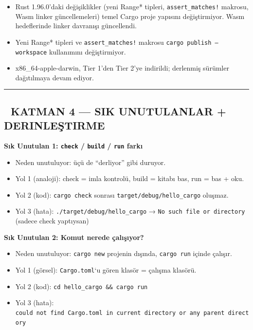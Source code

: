 \documentclass[12pt,a4paper]{article}
\begin{document}
\begin{itemize}
\tightlist
\item
  Rust 1.96.0'daki değişiklikler (yeni Range* tipleri, \texttt{assert\_matches!} makrosu, Wasm linker güncellemeleri) temel Cargo proje yapısını değiştirmiyor. Wasm hedeflerinde linker davranışı güncellendi.
\item
  Yeni Range* tipleri ve \texttt{assert\_matches!} makrosu \texttt{cargo\ publish\ --workspace} kullanımını değiştirmiyor.
\item
  x86\_64-apple-darwin, Tier 1'den Tier 2'ye indirildi; derlenmiş sürümler dağıtılmaya devam ediyor.
\end{itemize}

\begin{center}\rule{0.5\linewidth}{0.5pt}\end{center}

\subsection{🔴 KATMAN 4 --- SIK UNUTULANLAR + DERINLEŞTIRME}\label{katman-4-—-sik-unutulanlar-derinleştirme}

\textbf{Sık Unutulan 1: \texttt{check} / \texttt{build} / \texttt{run} farkı}

\begin{itemize}
\tightlist
\item
  Neden unutuluyor: üçü de ``derliyor'' gibi duruyor.
\item
  Yol 1 (analoji): check = imla kontrolü, build = kitabı bas, run = bas + oku.
\item
  Yol 2 (kod): \texttt{cargo\ check} sonrası \texttt{target/debug/hello\_cargo} oluşmaz.
\item
  Yol 3 (hata): \texttt{./target/debug/hello\_cargo} → \texttt{No\ such\ file\ or\ directory} (sadece check yaptıysan)
\end{itemize}

\textbf{Sık Unutulan 2: Komut nerede çalışıyor?}

\begin{itemize}
\tightlist
\item
  Neden unutuluyor: \texttt{cargo\ new} projenin dışında, \texttt{cargo\ run} içinde çalışır.
\item
  Yol 1 (görsel): \texttt{Cargo.toml}`u gören klasör = çalışma klasörü.
\item
  Yol 2 (kod): \texttt{cd\ hello\_cargo\ \&\&\ cargo\ run}
\item
  Yol 3 (hata): \texttt{could\ not\ find\ Cargo.toml\ in\ current\ directory\ or\ any\ parent\ directory}
\end{itemize}
\end{document}

